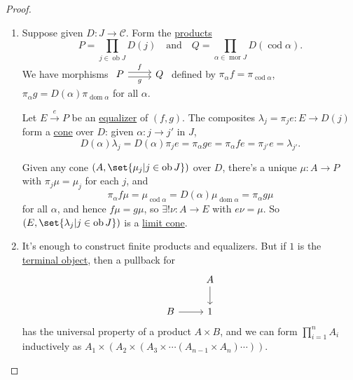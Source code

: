 \documentclass{article}
\DeclareMathOperator{\ob}{ob}
\DeclareMathOperator{\mor}{mor}
\DeclareMathOperator{\dom}{dom}
\DeclareMathOperator{\cod}{cod}
\let\to\longrightarrow
\begin{document}
\begin{proof}\leavevmode
  \begin{enumerate}[label=(\roman*)]
    \item Suppose given $D: J \to \mathscr{C}$.
      Form the \hyperlink{def:lprod}{products}
      \begin{equation*}
        P = \prod_{j \in \ob J} D(j) \quad \text{and}\quad
        Q = \prod_{\alpha\in\mor J} D(\cod \alpha).
      \end{equation*}
    We have morphisms $\begin{tikzcd}P \rar[shift left]{f} \rar[shift right,']{g} & Q\end{tikzcd}$ defined by $\pi_\alpha f = \pi_{\cod \alpha}$, $\pi_\alpha g = D(\alpha) \pi_{\dom \alpha}$ for all $\alpha$.

    Let $E \overset{e}\to P$ be an \hyperlink{def:equalizer}{equalizer} of $(f,g)$.
    The composites $\lambda_j = \pi_j e: E \to D(j)$ form a \hyperlink{def:cone}{cone} over $D$:
    given $\alpha: j \to j'$ in $J$,
    \begin{equation*}
      D(\alpha) \lambda_j = D(\alpha) \pi_j e = \pi_\alpha g e = \pi_\alpha f e = \pi_{j'} e = \lambda_{j'}.
    \end{equation*}

    Given any cone $(A, \set{\mu_j | j \in \ob J})$ over $D$, there's a unique $\mu: A \to P$ with $\pi_j \mu = \mu_j$ for each $j$, and
    \begin{equation*}
      \pi_\alpha f \mu = \mu_{\cod \alpha} = D(\alpha) \mu_{\dom \alpha} = \pi_\alpha g \mu
    \end{equation*}
    for all $\alpha$, and hence $f\mu = g\mu$, so $\exists ! \nu: A \to E$ with $e \nu = \mu$.
    So $(E, \set{\lambda_j | j \in \ob J})$ is a \hyperlink{def:limit}{limit cone}.
  \item It's enough to construct finite products and equalizers.
    But if $1$ is the \hyperlink{def:terminal}{terminal object}, then a pullback for
    \begin{equation*}
      \begin{tikzcd}
        & A \dar \\
        B \rar & 1
      \end{tikzcd}
    \end{equation*}
    has the universal property of a product $A \times B$, and we can form $\prod_{i=1}^n A_i$ inductively as $A_1 \times (A_2 \times (A_3 \times \dotsm (A_{n-1} \times A_n) \dotsm)).$


\end{enumerate}
\end{proof}
\end{document}

